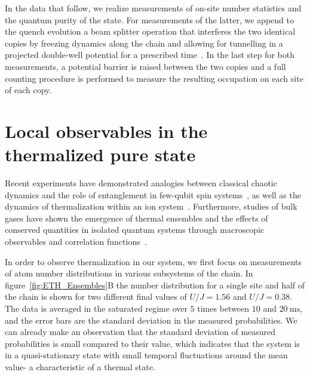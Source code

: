 In the data that follow, we realize measurements of on-site number statistics and the quantum purity of the state. For measurements of the latter, we append to the quench evolution a beam splitter operation that interferes the two identical copies by freezing dynamics along the chain and allowing for tunnelling in a projected double-well potential for a prescribed time~\cite{Islam2015}. In the last step for both measurements, a potential barrier is raised between the two copies and a full counting procedure is performed to measure the resulting occupation on each site of each copy.

\section{Local observables in the thermalized pure state}
Recent experiments have demonstrated analogies between classical chaotic dynamics and the role of entanglement in few-qubit spin systems~\cite{Neill2016}, as well as the dynamics of thermalization within an ion system~\cite{Clos2016}. Furthermore, studies of bulk gases have shown the emergence of thermal ensembles and the effects of conserved quantities in isolated quantum systems through macroscopic observables and correlation functions~\cite{Trotzky2012,Langen2013,Geiger2014,Langen2015}.

In order to observe thermalization in our system, we first focus on measurements of atom number distributions in various subsystems of the chain. In figure~\ref{fig:ETH_Ensembles}B the number distribution for a single site and half of the chain is shown for two different final values of $U/J = 1.56$ and $U/J =0.38$. The data is averaged in the saturated regime over $5$ times between $10$ and $20~\mathrm{ms}$, and the error bars are the standard deviation in the measured probabilities. We can already make an observation that the standard deviation of measured probabilities is small compared to their value, which indicates that the system is in a quasi-stationary state with small temporal fluctuations around the mean value- a characteristic of a thermal state.


